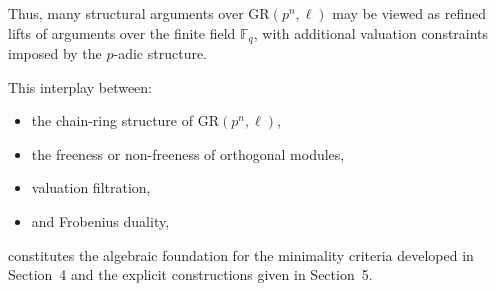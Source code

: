 \documentclass[10pt]{article}
\theoremstyle{definition}
\begin{document}
Thus, many structural arguments over $\mathrm{GR}(p^{n},\ell)$
may be viewed as refined lifts of arguments over the finite field $\mathbb{F}_q$,
with additional valuation constraints imposed by the $p$-adic structure.

\medskip

This interplay between:

\begin{itemize}
\item the chain-ring structure of $\mathrm{GR}(p^{n},\ell)$,
\item the freeness or non-freeness of orthogonal modules,
\item valuation filtration,
\item and Frobenius duality,
\end{itemize}

constitutes the algebraic foundation for the minimality criteria
developed in Section~4 and the explicit constructions
given in Section~5.
\end{document}
